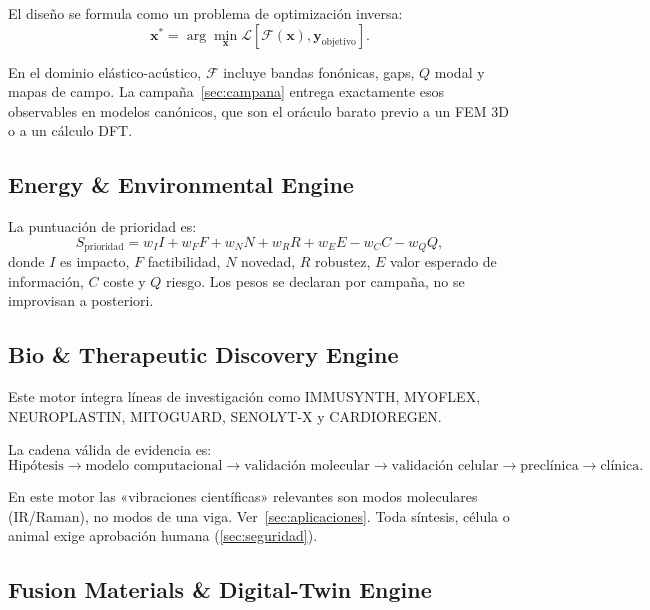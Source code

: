 \documentclass[11pt,a4paper]{article}
\begin{document}
El diseño se formula como un problema de optimización inversa:
\begin{equation}
\mathbf{x}^{*}
=
\arg\min_{\mathbf{x}}
\mathcal{L}
\left[
\mathcal{F}(\mathbf{x}),
\mathbf{y}_{\mathrm{objetivo}}
\right].
\end{equation}

En el dominio elástico-acústico, $\mathcal{F}$ incluye bandas fonónicas, gaps, $Q$ modal y mapas de campo. La campaña~\cref{sec:campana} entrega exactamente esos observables en modelos canónicos, que son el oráculo barato previo a un FEM 3D o a un cálculo DFT.

\subsection{Energy \& Environmental Engine}

La puntuación de prioridad es:
\begin{equation}
S_{\mathrm{prioridad}} =
w_I I +
w_F F +
w_N N +
w_R R +
w_E E -
w_C C -
w_Q Q,
\label{eq:score}
\end{equation}
donde $I$ es impacto, $F$ factibilidad, $N$ novedad, $R$ robustez, $E$ valor esperado de información, $C$ coste y $Q$ riesgo. Los pesos se declaran por campaña, no se improvisan a posteriori.

\subsection{Bio \& Therapeutic Discovery Engine}

Este motor integra líneas de investigación como IMMUSYNTH, MYOFLEX, NEUROPLASTIN, MITOGUARD, SENOLYT-X y CARDIOREGEN.

La cadena válida de evidencia es:
\begin{equation}
\text{Hipótesis}
\rightarrow
\text{modelo computacional}
\rightarrow
\text{validación molecular}
\rightarrow
\text{validación celular}
\rightarrow
\text{preclínica}
\rightarrow
\text{clínica}.
\end{equation}

En este motor las «vibraciones científicas» relevantes son modos moleculares (IR/Raman), no modos de una viga. Ver~\cref{sec:aplicaciones}. Toda síntesis, célula o animal exige aprobación humana (\cref{sec:seguridad}).

\subsection{Fusion Materials \& Digital-Twin Engine}
\end{document}
